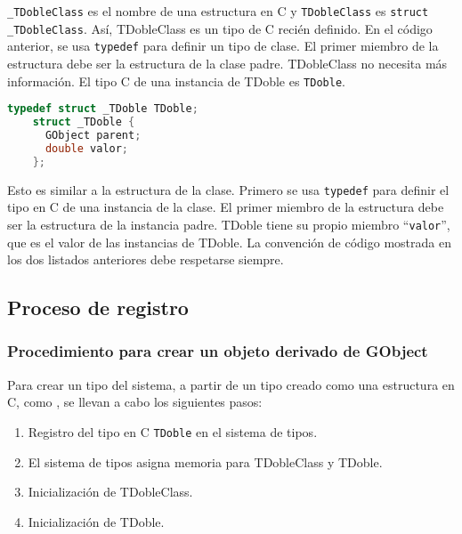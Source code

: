   \texttt{\_TDobleClass} es el nombre de una estructura en C y \texttt{TDobleClass} es \texttt{struct \_TDobleClass}.
  Así, \textsf{TDobleClass} es un tipo de C recién definido.
  En el código anterior, se usa \texttt{typedef} para definir un tipo de clase. El primer miembro de la estructura
  debe ser la estructura de la clase padre. \textsf{TDobleClass} no necesita más información. El tipo C de una
  instancia de \textsf{TDoble} es \texttt{TDoble}.
  \begin{lstlisting}[language=C]
    typedef struct _TDoble TDoble;
    struct _TDoble {
      GObject parent;
      double valor;
    };
  \end{lstlisting}
  
  Esto es similar a la estructura de la clase. Primero se usa \texttt{typedef} para definir el tipo en C de una
  instancia de la clase. El primer miembro de la estructura debe ser la estructura de la instancia padre.
  \textsf{TDoble} tiene su propio miembro ``\texttt{valor}'', que es el valor de las instancias de \textsf{TDoble}.
  La convención de código mostrada en los dos listados anteriores debe respetarse siempre.

  \subsection{Proceso de registro}
  \subsubsection{Procedimiento para crear un objeto derivado de \textsf{GObject}}
  Para crear un tipo del sistema, a partir de un tipo creado como una estructura en C,
  como , se llevan a cabo los siguientes pasos:
  \begin{enumerate}
    \tightlist
  \item Registro del tipo en C \texttt{TDoble} en el sistema de tipos.
  \item El sistema de tipos asigna memoria para \textsf{TDobleClass} y \textsf{TDoble}.
  \item Inicialización de \textsf{TDobleClass}.
  \item Inicialización de \textsf{TDoble}.
  \end{enumerate}

